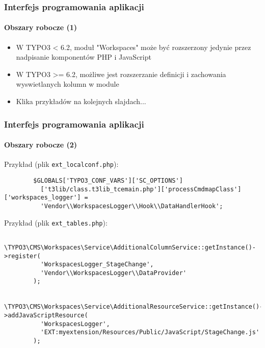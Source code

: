 
\begin{frame}[fragile]
	\frametitle{Interfejs programowania aplikacji}
	\framesubtitle{Obszary robocze (1)}

	\begin{itemize}
		\item W TYPO3 < 6.2, moduł "Workspaces" może być rozszerzony jedynie przez nadpisanie komponentów PHP i JavaScript
		\item W TYPO3 >= 6.2, możliwe jest rozszerzanie definicji i zachowania wyswietlanych kolumn w module
		\item Klika przykładów na kolejnych slajdach...
	\end{itemize}

\end{frame}


\begin{frame}[fragile]
	\frametitle{Interfejs programowania aplikacji}
	\framesubtitle{Obszary robocze (2)}

	\lstset{
		basicstyle=\tiny\ttfamily
	}

	Przykład (plik \texttt{ext\_localconf.php}):

	\begin{lstlisting}
		$GLOBALS['TYPO3_CONF_VARS']['SC_OPTIONS']
		  ['t3lib/class.t3lib_tcemain.php']['processCmdmapClass']['workspaces_logger'] =
		  'Vendor\\WorkspacesLogger\\Hook\\DataHandlerHook';
	\end{lstlisting}

	Przykład (plik \texttt{ext\_tables.php}):

	\begin{lstlisting}
		\TYPO3\CMS\Workspaces\Service\AdditionalColumnService::getInstance()->register(
		  'WorkspacesLogger_StageChange',
		  'Vendor\\WorkspacesLogger\\DataProvider'
		);

		\TYPO3\CMS\Workspaces\Service\AdditionalResourceService::getInstance()->addJavaScriptResource(
		  'WorkspacesLogger',
		  'EXT:myextension/Resources/Public/JavaScript/StageChange.js'
		);
	\end{lstlisting}

\end{frame}

